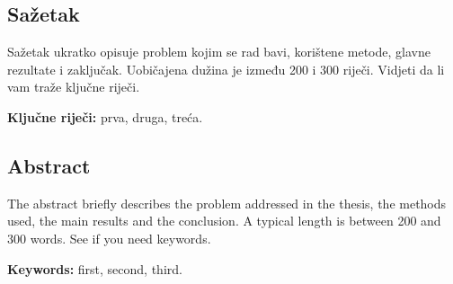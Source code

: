 \thispagestyle{empty}
\vspace*{\fill}

\subsection*{Sažetak}

	Sažetak ukratko opisuje problem kojim se rad bavi, korištene metode, glavne
	rezultate i zaključak.
	Uobičajena dužina je između 200 i 300 riječi.
	Vidjeti da li vam traže ključne riječi.

	\textbf{Ključne riječi:} prva, druga, treća.

	\clearpage

	\thispagestyle{empty}
	\vspace*{\fill}

\subsection*{Abstract}

	The abstract briefly describes the problem addressed in the thesis, the methods
	used, the main results and the conclusion.
	A typical length is between 200 and 300 words.
	See if you need keywords.

	\textbf{Keywords:} first, second, third.

	\cleardoublepage
